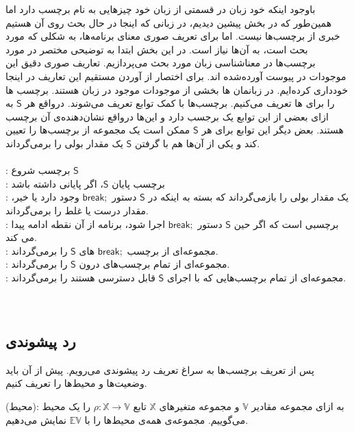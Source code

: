 با‌وجود اینکه خود زبان  در قسمتی از زبان خود چیز‌هایی به نام برچسب دارد اما همین‌طور که در بخش پیشین دیدیم، در زبانی که اینجا در حال بحث روی آن هستیم خبری از برچسب‌ها نیست. اما برای تعریف صوری معنای برنامه‌ها، به شکلی که مورد بحث است، به آن‌ها نیاز است. در این بخش ابتدا به توضیحی مختصر در مورد برچسب‌ها در معناشناسی‌ زبان مورد بحث می‌پردازیم. تعاریف صوری دقیق این موجودات در پیوست \cite{calcul} آورده‌شده اند. برای اختصار از آوردن مستقیم این تعاریف در اینجا خود‌داری کرده‌ایم. 
در زبانمان ها بخشی از موجودات موجود در زبان هستند. برچسب ها را برای ها تعریف می‌کنیم. برچسب‌ها با کمک توابع  تعریف می‌شوند. در‌واقع هر $\mathsf{S}$ به ازای بعضی از این توابع یک برجسب دارد و این‌ها در‌واقع نشان‌دهنده‌ی آن برچسب هستند. بعض دیگر این توابع برای هر $\mathsf{S}$ ممکن است یک مجموعه از برچسب‌ها را تعیین‌ کند و یکی از آن‌ها هم با گرفتن $\mathsf{S}$ یک مقدار بولی را بر‌می‌گرداند. 
\\\\
 : برچسب شروع $\mathsf{S}$\\
 : برچسب پایان $\mathsf{S}$، اگر پایانی داشته باشد\\
 : یک مقدار بولی را باز‌‌می‌گرداند که بسته به اینکه در $\mathsf{S}$ دستور $\mathsf{break;}$ وجود دارد یا خیر، مقدار درست یا غلط را بر‌می‌گرداند.\\
 : برچسبی است که اگر حین $\mathsf{S}$ دستور $\mathsf{break;}$ اجرا شود، برنامه از آن نقطه ادامه پیدا می کند.\\
 : مجموعه‌ای از برچسب $\mathsf{break;}$ های $\mathsf{S}$ را بر‌می‌گرداند.\\
 : مجموعه‌ای از تمام برچسب‌های درون $\mathsf{S}$ را برمی‌گرداند.\\
 : مجموعه‌ای از تمام بر‌چسب‌هایی که با اجرای $\mathsf{S}$ قابل دسترسی هستند را بر‌می‌گرداند.\\\\\\


\subsection{رد پیشوندی}


پس از تعریف برچسب‌ها به سراغ تعریف رد پیشوندی می‌رویم. پیش از آن باید وضعیت‌ها و محیط‌ها را تعریف کنیم.
\begin{defn}
	(محیط): به ازای مجموعه مقادیر $\mathbb{V}$ و مجموعه متغیرهای $\mathbb{X}$ تابع 
	$\rho : \mathbb{X} \rightarrow \mathbb{V}$ 
	را یک محیط می‌گوییم. مجموعه‌ی همه‌ی محیط‌ها را با $\mathbb{EV}$ نمایش می‌دهیم.
\end{defn}

